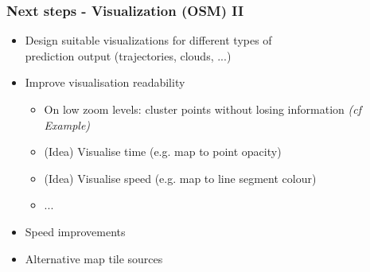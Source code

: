 \documentclass[xcolor=dvipsnames]{beamer}
\begin{document}
\begin{frame}
	\frametitle{Next steps - Visualization (OSM) II}
	\begin{itemize} 
		\item Design suitable visualizations for different types of\\ prediction output (trajectories, clouds, ...)
		\item Improve visualisation readability
		\begin{itemize} 
		 	\item On low zoom levels: cluster points without losing information \textit{(cf Example)}
		 	\item (Idea) Visualise time (e.g. map to point opacity)
		 	\item (Idea) Visualise speed (e.g. map to line segment colour)
		 	\item ...
		\end{itemize} 
		\item Speed improvements
		\item Alternative map tile sources
	\end{itemize} 
\end{frame}
\end{document}
